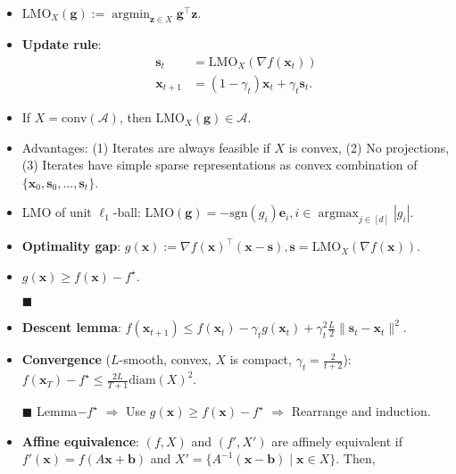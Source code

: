 \documentclass[a4paper]{article}
\DeclareMathOperator*{\argmax}{argmax}
\DeclareMathOperator*{\argmin}{argmin}
\renewcommand{\vec}[1]{\mathbf{#1}}
\newcommand{\mat}[1]{#1}
\newcommand{\proofsquare}{$\blacksquare$}
\newenvironment{topic}[1]
{\textbf{\sffamily \colorbox{black}{\rlap{\textbf{\textcolor{white}{#1}}}\hspace{\linewidth}\hspace{-2\fboxsep}}} \\ \vspace{0.2cm}}
{}
\begin{document}
\begin{multicols*}{2}
    \begin{topic}{Frank-Wolfe}
        \begin{itemize}
            \item $\mathrm{LMO}_X(\vec{g}) := \argmin_{\vec{z} \in X} \vec{g}^\top \vec{z}$.
            \item \textbf{Update rule}:
                  \begin{align*}
                      \vec{s}_t     & = \mathrm{LMO}_X(\nabla f(\vec{x}_t))          \\
                      \vec{x}_{t+1} & = (1-\gamma_t) \vec{x}_t + \gamma_t \vec{s}_t.
                  \end{align*}
            \item If $X = \mathrm{conv}(\mathcal{A})$, then $\mathrm{LMO}_X(\vec{g}) \in \mathcal{A}$.
            \item Advantages: (1) Iterates are always feasible if $X$ is convex, (2) No projections, (3) Iterates
                  have simple sparse representations as convex combination of $\{ \vec{x}_0, \vec{s}_0, \ldots,
                      \vec{s}_t \}$.
            \item LMO of unit $\ell_1$-ball: $\mathrm{LMO}(\vec{g}) = -\mathrm{sgn}(g_i) \vec{e}_i, i \in \argmax_{j
                          \in [d]} |g_i|$.
            \item \textbf{Optimality gap}: $g(\vec{x}) := \nabla f(\vec{x})^\top (\vec{x} - \vec{s}), \vec{s} = \mathrm{LMO}_X(\nabla f(\vec{x}))$.
            \item $g(\vec{x}) \geq f(\vec{x}) - f^\star$.
            \item[\proofsquare]
            \item \textbf{Descent lemma}: $f(\vec{x}_{t+1}) \leq f(\vec{x}_t) - \gamma_t g(\vec{x}_t) + \gamma_t^2 \frac{L}{2} \| \vec{s}_t - \vec{x}_t \|^2$.
            \item \textbf{Convergence} ($L$-smooth, convex, $X$ is compact, $\gamma_t = \frac{2}{t+2}$): \\ $f(\vec{x}_T) - f^\star \leq \frac{2L}{T+1} \mathrm{diam}(X)^2$.
            \item[\proofsquare] Lemma$-f^\star$ $\Rightarrow$ Use $g(\vec{x}) \geq f(\vec{x}) - f^\star$ $\Rightarrow$ Rearrange and induction.
            \item \textbf{Affine equivalence}: $(f, X)$ and $(f', X')$ are affinely equivalent if $f'(\vec{x}) = f(\mat{A} \vec{x} + \vec{b})$ and $X' = \{ \mat{A}^{-1}(\vec{x} - \vec{b}) \mid \vec{x} \in X \}$. Then,

\end{itemize}
\end{topic}
\end{multicols*}
\end{document}

